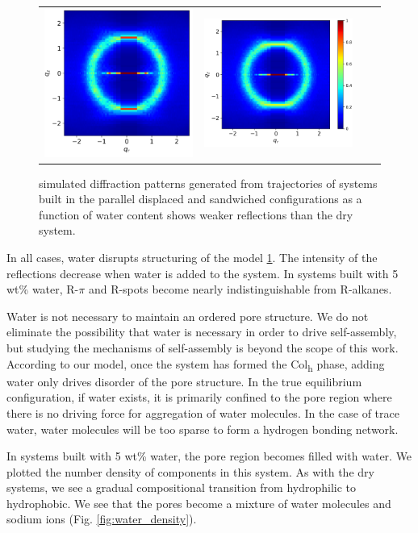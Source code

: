 \documentclass{article}
\begin{document}
\begin{figure}
\begin{tabular}{@{}c@{ }c@{ }c@{ }c@{}}
  	\includegraphics[width=.28\linewidth]{solvated_layered_rzplot_25.png}&
  	\includegraphics[width=.325\linewidth]{solvated_layered_rzplot_5.png}\\[-1ex]
  	\end{tabular}
  	\caption{simulated diffraction patterns generated from trajectories of systems 
  	built in the parallel displaced and sandwiched configurations as a function
  	of water content shows weaker reflections than the dry system.}%
  \label{fig:solvation}

  \end{figure}
 
  In all cases, water disrupts structuring of the model \ref{fig:solvation}.
  The intensity of the reflections decrease when water is added to the system. In
  systems built with 5 wt\% water, R-$\pi$ and R-spots become nearly
  indistinguishable from R-alkanes.

  Water is not necessary to maintain an ordered pore structure. We do not
  eliminate the possibility that water is necessary in order to drive
  self-assembly, but studying the mechanisms of self-assembly is beyond the
  scope of this work. According to our model, once the system has formed the
  Col\textsubscript{h} phase, adding water only drives disorder of the pore
  structure. In the true equilibrium configuration, if water exists, it is
  primarily confined to the pore region where there is no driving force for
  aggregation of water molecules. In the case of trace water, water molecules
  will be too sparse to form a hydrogen bonding network.

  In systems built with 5 wt\% water, the pore region becomes filled with
  water. We plotted the number density of components in this system. As with the 
  dry systems, we see a gradual compositional transition from hydrophilic to hydrophobic.  
  We see that the pores become a mixture of water molecules and sodium ions (Fig.
  \ref{fig:water_density}). 
  
\end{document}
